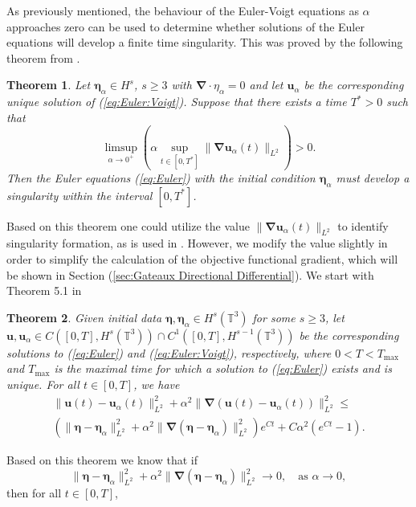 \documentclass[12pt]{article}
\def\u{\boldsymbol u}
\def\ua{\boldsymbol u_\alpha}
\def\bn{\boldsymbol \nabla}
\def\be{\boldsymbol \eta}
\def\bea{\boldsymbol \eta_\alpha}
\def\ea{\eta_\alpha}
\def\TT{\mathbb{T}}
\newtheorem{thm}{Theorem}[section]
\numberwithin{equation}{section}
\begin{document}
As previously mentioned, the behaviour of the Euler-Voigt equations as $\alpha$ approaches zero can be used to determine whether solutions of the Euler equations will develop a finite time singularity. This was proved by the following theorem from \cite{larios_computational_2018}.
\begin{thm}\label{thm:Theorem:1.1}
Let $\bea\in H^s$, $s\geq 3$ with $\bn \cdot \ea = 0$ and let $\ua$ be the corresponding unique solution of (\ref{eq:Euler:Voigt}). Suppose that there exists a time $T^*>0$ such that
\begin{equation}
\limsup_{\alpha \rightarrow 0^+} \left( \alpha \sup_{t\in[0,T^*]} \|\bn \ua(t)\|_{L^2}\right) > 0.
\end{equation}
Then the Euler equations (\ref{eq:Euler}) with the initial condition $\be_\alpha$ must develop a singularity within the interval $[0,T^*]$.
\end{thm}
\noindent Based on this theorem one could utilize the value $\|\bn\ua(t)\|_{L^2}$ to identify singularity formation, as is used in \cite{larios_computational_2018}. However, we modify the value slightly in order to simplify the calculation of the objective functional gradient, which will be shown in Section (\ref{sec:Gateaux Directional Differential}). We start with Theorem 5.1 in \cite{larios_higher-order_2010}
\begin{thm}\label{thm:Theorem:1.2}
Given initial data $\be,\bea \in H^s(\TT^3)$ for some $s\geq 3$, let $\u,\ua \in C([0,T],H^s(\TT^3))\cap C^1([0,T],H^{s-1}(\TT^3))$ be the corresponding solutions to (\ref{eq:Euler}) and (\ref{eq:Euler:Voigt}), respectively, where $0<T<T_{\text{max}}$ and $T_{\text{max}}$ is the maximal time for which a solution to (\ref{eq:Euler}) exists and is unique. For all $t\in[0,T]$, we have 
\begin{equation}
\begin{aligned}
\|\u(t)-\ua(t)\|_{L^2}^2 + \alpha^2\|\bn(\u(t)-\ua(t))\|_{L^2}^2 \leq \\ \left( \|\be-\bea \|_{L^2}^2 + \alpha^2\|\bn(\be - \bea)\|_{L^2}^2 \right)e^{Ct} + C\alpha^2(e^{Ct}-1).
\end{aligned}
\end{equation}
\end{thm}
\noindent Based on this theorem we know that if
\begin{equation}
\|\be-\bea\|_{L^2}^2+\alpha^2\|\bn(\be-\bea)\|_{L^2}^2 \rightarrow 0, \quad \text{as } \alpha\rightarrow 0,
\end{equation}
then for all $t\in [0,T]$,
\end{document}
